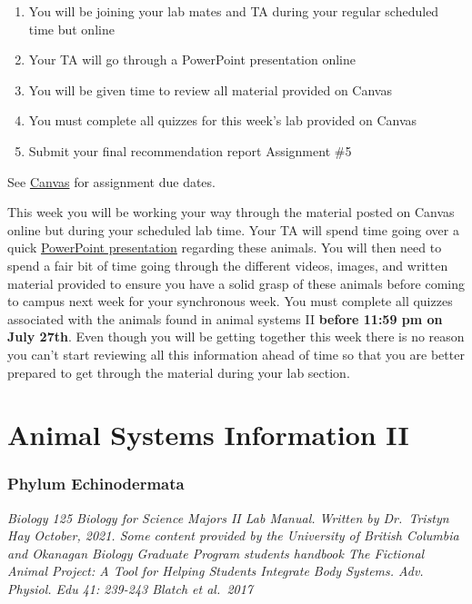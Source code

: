\documentclass[
]{book}
\providecommand{\tightlist}{%
  \setlength{\itemsep}{0pt}\setlength{\parskip}{0pt}}
\begin{document}
\begin{enumerate}
\def\labelenumi{\arabic{enumi}.}
\tightlist
\item
  You will be joining your lab mates and TA during your regular scheduled time but online
\item
  Your TA will go through a PowerPoint presentation online
\item
  You will be given time to review all material provided on Canvas
\item
  You must complete all quizzes for this week's lab provided on Canvas
\item
  Submit your final recommendation report Assignment \#5
\end{enumerate}

See \href{https://canvas.ubc.ca}{Canvas} for assignment due dates.

This week you will be working your way through the material posted on Canvas online but during your scheduled lab time. Your TA will spend time going over a quick \href{https://osf.io/download/6wupk}{PowerPoint presentation} regarding these animals. You will then need to spend a fair bit of time going through the different videos, images, and written material provided to ensure you have a solid grasp of these animals before coming to campus next week for your synchronous week. You must complete all quizzes associated with the animals found in animal systems II \textbf{before 11:59 pm on July 27th}. Even though you will be getting together this week there is no reason you can't start reviewing all this information ahead of time so that you are better prepared to get through the material during your lab section.

\hypertarget{animal-systems-information-ii}{%
\chapter*{Animal Systems Information II}\label{animal-systems-information-ii}}

\hypertarget{phylum-echinodermata}{%
\subsection*{Phylum Echinodermata}\label{phylum-echinodermata}}

\emph{Biology 125 Biology for Science Majors II Lab Manual. Written by Dr.~Tristyn Hay October, 2021. Some content provided by the University of British Columbia and Okanagan Biology Graduate Program students handbook The Fictional Animal Project: A Tool for Helping Students Integrate Body Systems. Adv. Physiol. Edu 41: 239-243 Blatch et al.~2017}
\end{document}
